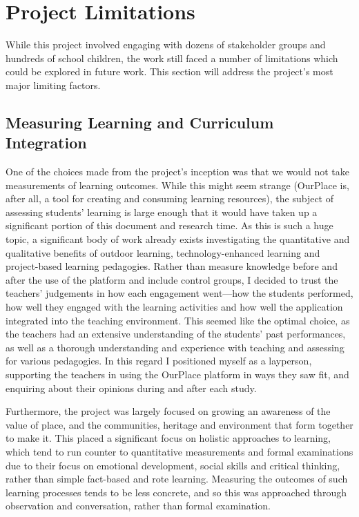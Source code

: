 \section{Project Limitations}

While this project involved engaging with dozens of stakeholder groups and hundreds of school children, the work still faced a number of limitations which could be explored in future work. This section will address the project's most major limiting factors.

\subsection*{Measuring Learning and Curriculum Integration}
One of the choices made from the project's inception was that we would not take measurements of learning outcomes. While this might seem strange (OurPlace is, after all, a tool for creating and consuming learning resources), the subject of assessing students' learning is large enough that it would have taken up a significant portion of this document and research time. As this is such a huge topic, a significant body of work already exists investigating the quantitative and qualitative benefits of outdoor learning, technology-enhanced learning and project-based learning pedagogies. Rather than measure knowledge before and after the use of the platform and include control groups, I decided to trust the teachers' judgements in how each engagement went---how the students performed, how well they engaged with the learning activities and how well the application integrated into the teaching environment. This seemed like the optimal choice, as the teachers had an extensive understanding of the students' past performances, as well as a thorough understanding and experience with teaching and assessing for various pedagogies. In this regard I positioned myself as a layperson, supporting the teachers in using the OurPlace platform in ways they saw fit, and enquiring about their opinions during and after each study.

Furthermore, the project was largely focused on growing an awareness of the value of place, and the communities, heritage and environment that form together to make it. This placed a significant focus on holistic approaches to learning, which tend to run counter to quantitative measurements and formal examinations due to their focus on emotional development, social skills and critical thinking, rather than simple fact-based and rote learning. Measuring the outcomes of such learning processes tends to be less concrete, and so this was approached through observation and conversation, rather than formal examination.


